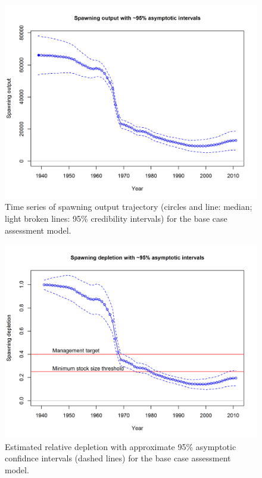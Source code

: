 \documentclass[12pt,]{article}
\begin{document}
\FloatBarrier

\begin{figure}
\centering
\includegraphics{r4ss/plots_mod1/ts7_Spawning_output_with_95_asymptotic_intervals_intervals.png}
\caption{Time series of spawning output trajectory (circles and line:
median; light broken lines: 95\% credibility intervals) for the base
case assessment model. \label{fig:Spawnbio_all}}
\end{figure}

\begin{figure}
\centering
\includegraphics{r4ss/plots_mod1/ts9_Spawning_depletion_with_95_asymptotic_intervals_intervals.png}
\caption{Estimated relative depletion with approximate 95\% asymptotic
confidnce intervals (dashed lines) for the base case assessment model.
\label{fig:RelDeplete_all}}
\end{figure}
\end{document}
